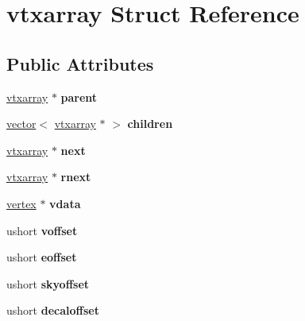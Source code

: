 \hypertarget{structvtxarray}{}\section{vtxarray Struct Reference}
\label{structvtxarray}
\subsection*{Public Attributes}
\begin{DoxyCompactItemize}
\item 
\mbox{\label{structvtxarray_aa5fad836e8824d7d361565778d7239b7}} 
\hyperlink{structvtxarray}{vtxarray} $\ast$ {\bfseries parent}
\item 
\mbox{\label{structvtxarray_a5c2fae3c821ab3f261bae489f3f0103b}} 
\hyperlink{structvector}{vector}$<$ \hyperlink{structvtxarray}{vtxarray} $\ast$ $>$ {\bfseries children}
\item 
\mbox{\label{structvtxarray_ad698f071995e4e3a6cf07262f09cbd69}} 
\hyperlink{structvtxarray}{vtxarray} $\ast$ {\bfseries next}
\item 
\mbox{\label{structvtxarray_a38cf716b599bb20b75c8d69073e8d72b}} 
\hyperlink{structvtxarray}{vtxarray} $\ast$ {\bfseries rnext}
\item 
\mbox{\label{structvtxarray_ad9dc71a0507a4e9ca98b8721fd2ec6e8}} 
\hyperlink{structvertex}{vertex} $\ast$ {\bfseries vdata}
\item 
\mbox{\label{structvtxarray_a6ad16c4f3cbabb162a901d948f2515b1}} 
ushort {\bfseries voffset}
\item 
\mbox{\label{structvtxarray_a933f059c5ebbcfe89a0c54f976fe1d8c}} 
ushort {\bfseries eoffset}
\item 
\mbox{\label{structvtxarray_aa99a35a720c84c778711ee40bc534805}} 
ushort {\bfseries skyoffset}
\item 
\mbox{\label{structvtxarray_adbbc2b55e38322f1c2aa76915abebe5b}} 
ushort {\bfseries decaloffset}
\item 

\end{DoxyCompactItemize}
